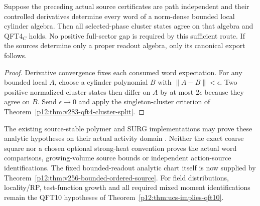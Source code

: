 \documentclass[12pt,a4paper]{article}
\begin{document}
\begin{corollary}
\label{p12:cor:v2210-lit-source-canonicity}
Suppose the preceding actual source certificates are path independent and
their controlled derivatives determine every word of a norm-dense bounded
local cylinder algebra. Then all selected-phase cluster states agree on
that algebra and QFT4$_C$ holds. No positive full-sector gap is required
by this sufficient route. If the sources determine only a proper readout
algebra, only its canonical export follows.
\end{corollary}
\begin{proof}
Derivative convergence fixes each consumed word expectation. For any
bounded local $A$, choose a cylinder polynomial $B$ with
$\|A-B\|<\epsilon$. Two positive normalized cluster states then differ
on $A$ by at most $2\epsilon$ because they agree on $B$. Send
$\epsilon\to0$ and apply the singleton-cluster criterion of
Theorem~\ref{p12:thm:v283-qft4-cluster-split}.
\end{proof}
The existing source-stable polymer and SURG implementations may prove
these analytic hypotheses on their actual activity domain
\cite{KoteckyPreiss1986}. Neither the exact coarse square nor a chosen
optional strong-heat convention proves the actual word comparisons,
growing-volume source bounds or independent action-source identifications.
The fixed bounded-readout analytic chart itself is now supplied by
Theorem~\ref{p12:thm:v256-bounded-ordered-source}.
For field distributions, locality/RP, test-function growth and all required
mixed moment identifications remain the QFT10 hypotheses of
Theorem~\ref{p12:thm:ucs-implies-qft10}.


\end{document}
